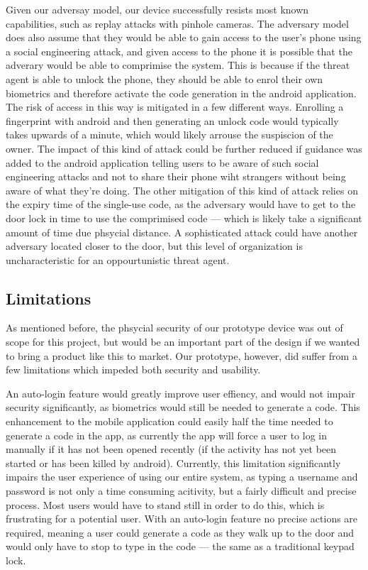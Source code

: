 \documentclass[conference]{IEEEtran}
\begin{document}
Given our adversay model, our device successfully resists most known capabilities, such as replay attacks with pinhole cameras.
The adversary model does also assume that they would be able to gain access to the user's phone using a social engineering attack, and given access to the phone it is possible that the adverary would be able to comprimise the system.
This is because if the threat agent is able to unlock the phone, they should be able to enrol their own biometrics and therefore activate the code generation in the android application.
The risk of access in this way is mitigated in a few different ways.
Enrolling a fingerprint with android  and then generating an unlock code would typically takes upwards of a minute, which would likely arrouse the suspiscion of the owner.
The impact of this kind of attack could be further reduced if guidance was added to the android application telling users to be aware of such social engineering attacks and not to share their phone wiht strangers without being aware of what they're doing.
The other mitigation of this kind of attack relies on the expiry time of the single-use code, as the adversary would have to get to the door lock in time to use the comprimised code --- which is likely take a significant amount of time due phsycial distance.
A sophisticated attack could have another adversary located closer to the door, but this level of organization is uncharacteristic for an oppourtunistic threat agent.

\subsection{Limitations}
As mentioned before, the phsycial security of our prototype device was out of scope for this project, but would be an important part of the design if we wanted to bring a product like this to market.
Our prototype, however, did suffer from a few limitations which impeded both security and usability.

An auto-login feature would greatly improve user effiency, and would not impair security significantly, as biometrics would still be needed to generate a code.
This enhancement to the mobile application could easily half the time needed to generate a code in the app, as currently the app will force a user to log in manually if it has not been opened recently (if the activity has not yet been started or has been killed by android).
Currently, this limitation significantly impairs the user experience of using our entire system, as typing a username and password is not only a time consuming acitivity, but a fairly difficult and precise process.
Most users would have to stand still in order to do this, which is frustrating for a potential user.
With an auto-login feature no precise actions are required, meaning a user could generate a code as they walk up to the door and would only have to stop to type in the code --- the same as a traditional keypad lock.
\end{document}
